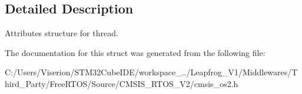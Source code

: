 \subsection{Detailed Description}
Attributes structure for thread. 

The documentation for this struct was generated from the following file\+:\begin{DoxyCompactItemize}
\item 
C\+:/\+Users/\+Viserion/\+S\+T\+M32\+Cube\+I\+D\+E/workspace\+\_../\+Leapfrog\+\_\+\+V1/\+Middlewares/\+Third\+\_\+\+Party/\+Free\+R\+T\+O\+S/\+Source/\+C\+M\+S\+I\+S\+\_\+\+R\+T\+O\+S\+\_\+\+V2/cmsis\+\_\+os2.\+h\end{DoxyCompactItemize}
